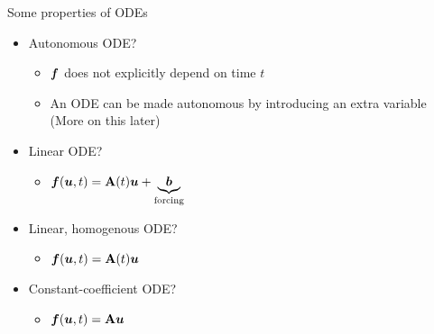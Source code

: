 \documentclass[presentation]{beamer}
\newcommand{\gv}[1]{\ensuremath{\mbox{\boldmath$ #1 $}}}
\newcommand{\bv}[1]{\ensuremath{\mathbf{#1}}}
\begin{document}
\begin{frame}[label={sec:org9a44348}]{Some properties of ODEs}
\begin{itemize}
\item \alert{Autonomous} ODE?
\begin{itemize}
\item \(\gv{f}\) does not explicitly depend on time \(t\)
\item An ODE can be made autonomous by introducing an extra variable (More on
this later)
\end{itemize}
\item \alert{Linear} ODE?
\begin{itemize}
\item \(\gv{f}(\gv{u}, t) =  \bv{A}(t)\gv{u} + \underbrace{\gv{b}}_{\text{forcing}}\)
\end{itemize}
\item \alert{Linear, homogenous} ODE?
\begin{itemize}
\item \(\gv{f}(\gv{u}, t) =  \bv{A}(t)\gv{u}\)
\end{itemize}
\item \alert{Constant-coefficient} ODE?
\begin{itemize}
\item \(\gv{f}(\gv{u}, t) =  \bv{A}\gv{u}\)
\end{itemize}
\end{itemize}
\end{frame}
\end{document}
